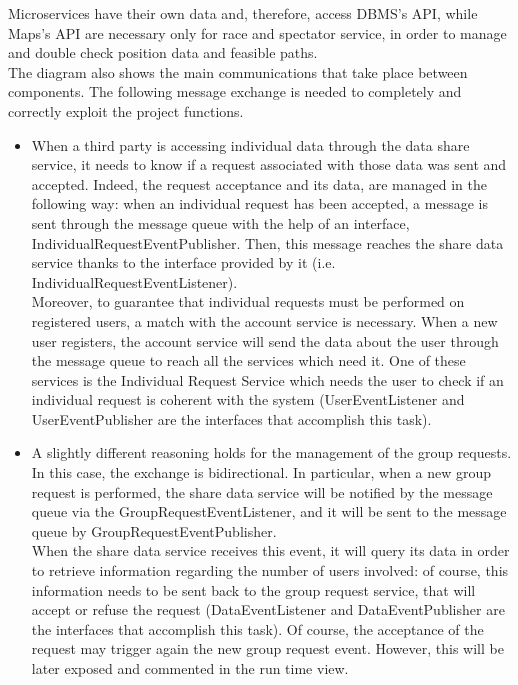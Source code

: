 Microservices have their own data and, therefore, access DBMS's API, while Maps's API are necessary 
only for race and spectator service, in order to manage and double check position data and feasible paths. \\
The diagram also shows the main communications that take place between components. 
The following message exchange is needed to completely and correctly exploit the project functions. 
\begin{itemize}
\item 
When a third party is accessing individual data through the data share service, it
needs to know if a request associated with those data was sent and accepted. 
Indeed, the request acceptance and its data, are managed in the following way: when an individual request has been accepted, a message is sent through the message queue with the help of an interface, IndividualRequestEventPublisher. Then, this message reaches the share data service thanks to the interface provided by it (i.e. IndividualRequestEventListener). \\
Moreover, to guarantee that individual requests must be performed on registered users, a match with the account service 
is necessary. When a new user registers, the account service will send the data about the user through the message queue to reach 
all the services which need it. One of these services is the Individual Request Service which needs the user to check if an individual 
request is coherent with the system (UserEventListener and UserEventPublisher are the interfaces that accomplish this task). 
\item 
A slightly different reasoning holds for the management of the group requests. In this case, the exchange is bidirectional. 
In particular, when a new group request is performed, the share data service will be notified by the message queue via the
GroupRequestEventListener, and it will be sent to the message queue by GroupRequestEventPublisher. \\
When the share data service receives this event, it will query its data in order to retrieve information regarding the number of users
involved: of course, this information needs to be sent back to the group request service, that will accept or refuse the request
(DataEventListener and DataEventPublisher are the interfaces that accomplish this task). 
Of course, the acceptance of the request may trigger again the new group request event. 
However, this will be later exposed and commented in the run time view. \\

\end{itemize}
